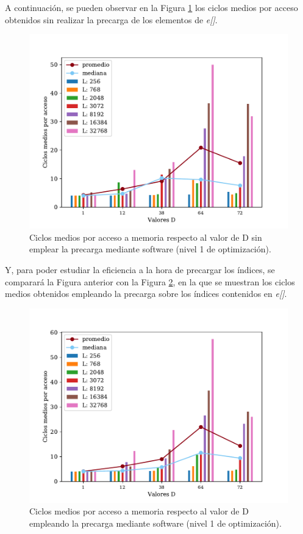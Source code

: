 \documentclass[conference]{IEEEtran}
\begin{document}
A continuación, se pueden observar en la Figura \ref{NoPrecargaSoftware} los ciclos medios por acceso obtenidos sin realizar la precarga de los elementos de \textit{e[]}.

\begin{figure}[htbp]
\centerline{\includegraphics[scale=0.64]{NoPrecargaSoftware.pdf}}
\caption{Ciclos medios por acceso a memoria respecto al valor de D sin emplear la precarga mediante software (nivel 1 de optimización).}
\label{NoPrecargaSoftware}
\end{figure}

Y, para poder estudiar la eficiencia a la hora de precargar los índices, se comparará la Figura anterior con la Figura \ref{precargaSoftware}, en la que se muestran los ciclos medios obtenidos empleando la precarga sobre los índices contenidos en \textit{e[]}.

\begin{figure}[htbp]
\centerline{\includegraphics[scale=0.64]{PrecargaSoftware.pdf}}
\caption{Ciclos medios por acceso a memoria respecto al valor de D empleando la precarga mediante software (nivel 1 de optimización).}
\label{precargaSoftware}
\end{figure}
\end{document}
